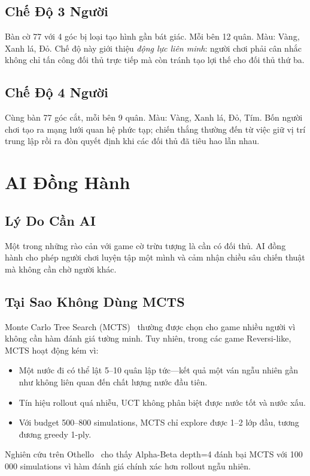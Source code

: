 \documentclass[12pt, a4paper]{article}
\begin{document}
\subsection{Chế Độ 3 Người}
Bàn cờ 7{\texttimes}7 với 4 góc bị loại tạo hình gần bát giác.
Mỗi bên 12 quân. Màu: Vàng, Xanh lá, Đỏ. Chế độ này giới thiệu
\emph{động lực liên minh}: người chơi phải cân nhắc không chỉ tấn công
đối thủ trực tiếp mà còn tránh tạo lợi thế cho đối thủ thứ ba.

\subsection{Chế Độ 4 Người}
Cùng bàn 7{\texttimes}7 góc cắt, mỗi bên 9 quân.
Màu: Vàng, Xanh lá, Đỏ, Tím. Bốn người chơi tạo ra mạng lưới quan hệ
phức tạp; chiến thắng thường đến từ việc giữ vị trí trung lập rồi ra
đòn quyết định khi các đối thủ đã tiêu hao lẫn nhau.

\section{AI Đồng Hành}
\label{sec:ai}

\subsection{Lý Do Cần AI}

Một trong những rào cản với game cờ trừu tượng là cần có đối thủ.
AI đồng hành cho phép người chơi luyện tập một mình và cảm nhận chiều
sâu chiến thuật mà không cần chờ người khác.

\subsection{Tại Sao Không Dùng MCTS}

Monte Carlo Tree Search (MCTS)~\cite{coulom2006efficient} thường được
chọn cho game nhiều người vì không cần hàm đánh giá tường minh. Tuy nhiên,
trong các game Reversi-like, MCTS hoạt động kém vì:
\begin{itemize}
  \item Một nước đi có thể lật 5--10 quân lập tức---kết quả một ván ngẫu
        nhiên gần như không liên quan đến chất lượng nước đầu tiên.
  \item Tín hiệu rollout quá nhiễu, UCT không phân biệt được nước tốt
        và nước xấu.
  \item Với budget 500--800 simulations, MCTS chỉ explore được 1--2 lớp
        đầu, tương đương greedy 1-ply.
\end{itemize}
Nghiên cứu trên Othello~\cite{buro1997good} cho thấy Alpha-Beta depth=4
đánh bại MCTS với 100\,000 simulations vì hàm đánh giá chính xác hơn
rollout ngẫu nhiên.
\end{document}
